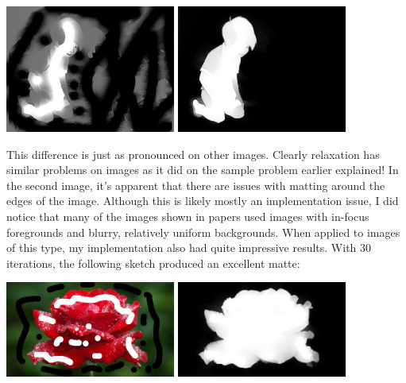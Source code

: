 \\
\begin{center}
\includegraphics[width=2.2in]{fig/christopher_med_result_nogrid.jpg}
\hspace{.2in}
\includegraphics[width=2.2in]{fig/christopher_med_result.jpg}
\end{center}
This difference is just as pronounced on other images. Clearly relaxation has similar problems on images as it did on the sample problem earlier explained! In the second image, it's apparent that there are issues with matting around the edges of the image. Although this is likely mostly an implementation issue, I did notice that many of the images shown in papers used images with in-focus foregrounds and blurry, relatively uniform backgrounds. When applied to images of this type, my implementation also had quite impressive results. With 30 iterations, the following sketch produced an excellent matte:
\\
\begin{center}
\includegraphics[width=2.2in]{fig/rose.jpg}
\hspace{.2in}
\includegraphics[width=2.2in]{fig/rose_result.jpg}
\end{center}
